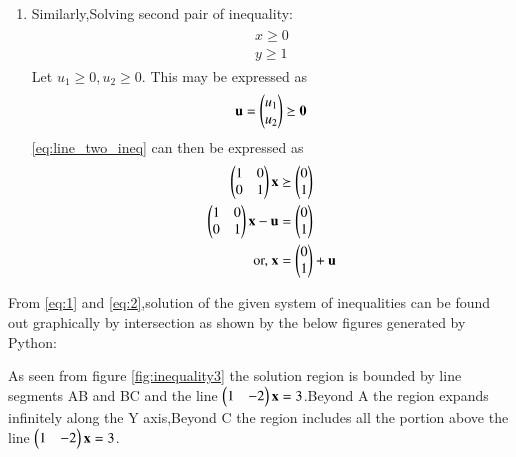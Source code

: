 \documentclass[journal,12pt,twocolumn]{IEEEtran}
\begin{document}
\begin{enumerate}
    \item Similarly,Solving second pair of inequality:
    \begin{align}
\label{eq:line_two_ineq}
\begin{split}
    x\geq 0
\\
    y \geq 1
\end{split}
\end{align}
\solution  Let $u_1 \ge 0, u_2 \ge 0$.  This may be expressed as
\begin{align}
\mathbf{u} = \begin{pmatrix}u_1\\u_2\end{pmatrix}\succeq \mathbf{0}
\end{align}
%
\eqref{eq:line_two_ineq} can then be expressed as
\begin{align}
\begin{pmatrix}1 & 0 \\ 0 & 1\end{pmatrix}\mathbf{x}  &\succeq \begin{pmatrix}0\\1\end{pmatrix}
\\
\begin{pmatrix}1 & 0 \\ 0 & 1\end{pmatrix}\mathbf{x}  -\mathbf{u}&=\begin{pmatrix}0\\1\end{pmatrix}
\\
\text{or, }
\mathbf{x} &= \begin{pmatrix}0\\1\end{pmatrix} +\mathbf{u}\label{eq:2}
\end{align}
\end{enumerate}
From \eqref{eq:1} and \eqref{eq:2},solution of the given system of inequalities can be found out graphically by intersection as shown by the below figures generated by Python:

As seen from figure \ref{fig:inequality3} the solution region is bounded by line segments AB and BC and the line $\begin{pmatrix}1&-2\end{pmatrix}\mathbf{x}=3$.Beyond A the region expands infinitely along the Y axis,Beyond C the region includes all the portion above the line $\begin{pmatrix}1&-2\end{pmatrix}\mathbf{x}=3$.
\end{document}
